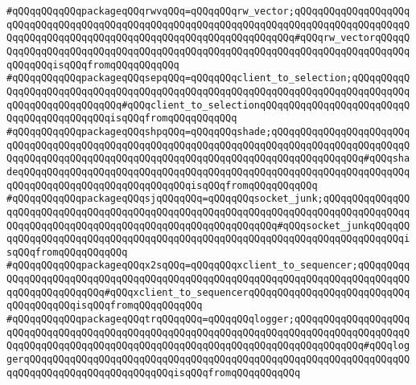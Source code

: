 \verb|#qQQqqQQqqQQqpackageqQQqrwvqQQq=qQQqqQQqrw_vector;qQQqqQQqqQQqqQQqqQQqqQQqqQQqqQQqqQQqqQQqqQQqqQQqqQQqqQQqqQQqqQQqqQQqqQQqqQQqqQQqqQQqqQQqqQQqqQQqqQQqqQQqqQQqqQQqqQQqqQQqqQQqqQQqqQQqqQQqqQQq#qQQqrw_vectorqQQqqQQqqQQqqQQqqQQqqQQqqQQqqQQqqQQqqQQqqQQqqQQqqQQqqQQqqQQqqQQqqQQqqQQqqQQqqQQqqQQqisqQQqfromqQQqqQQqqQQq|\newline
\verb|#qQQqqQQqqQQqpackageqQQqsepqQQq=qQQqqQQqclient_to_selection;qQQqqQQqqQQqqQQqqQQqqQQqqQQqqQQqqQQqqQQqqQQqqQQqqQQqqQQqqQQqqQQqqQQqqQQqqQQqqQQqqQQqqQQqqQQqqQQqqQQq#qQQqclient_to_selectionqQQqqQQqqQQqqQQqqQQqqQQqqQQqqQQqqQQqqQQqqQQqisqQQqfromqQQqqQQqqQQq|\newline
\verb|#qQQqqQQqqQQqpackageqQQqshpqQQq=qQQqqQQqshade;qQQqqQQqqQQqqQQqqQQqqQQqqQQqqQQqqQQqqQQqqQQqqQQqqQQqqQQqqQQqqQQqqQQqqQQqqQQqqQQqqQQqqQQqqQQqqQQqqQQqqQQqqQQqqQQqqQQqqQQqqQQqqQQqqQQqqQQqqQQqqQQqqQQqqQQqqQQq#qQQqshadeqQQqqQQqqQQqqQQqqQQqqQQqqQQqqQQqqQQqqQQqqQQqqQQqqQQqqQQqqQQqqQQqqQQqqQQqqQQqqQQqqQQqqQQqqQQqqQQqqQQqisqQQqfromqQQqqQQqqQQq|\newline
\verb|#qQQqqQQqqQQqpackageqQQqsjqQQqqQQq=qQQqqQQqsocket_junk;qQQqqQQqqQQqqQQqqQQqqQQqqQQqqQQqqQQqqQQqqQQqqQQqqQQqqQQqqQQqqQQqqQQqqQQqqQQqqQQqqQQqqQQqqQQqqQQqqQQqqQQqqQQqqQQqqQQqqQQqqQQqqQQqqQQq#qQQqsocket_junkqQQqqQQqqQQqqQQqqQQqqQQqqQQqqQQqqQQqqQQqqQQqqQQqqQQqqQQqqQQqqQQqqQQqqQQqqQQqisqQQqfromqQQqqQQqqQQq|\newline
\verb|#qQQqqQQqqQQqpackageqQQqx2sqQQq=qQQqqQQqxclient_to_sequencer;qQQqqQQqqQQqqQQqqQQqqQQqqQQqqQQqqQQqqQQqqQQqqQQqqQQqqQQqqQQqqQQqqQQqqQQqqQQqqQQqqQQqqQQqqQQqqQQq#qQQqxclient_to_sequencerqQQqqQQqqQQqqQQqqQQqqQQqqQQqqQQqqQQqqQQqisqQQqfromqQQqqQQqqQQq|\newline
\verb|#qQQqqQQqqQQqpackageqQQqtrqQQqqQQq=qQQqqQQqlogger;qQQqqQQqqQQqqQQqqQQqqQQqqQQqqQQqqQQqqQQqqQQqqQQqqQQqqQQqqQQqqQQqqQQqqQQqqQQqqQQqqQQqqQQqqQQqqQQqqQQqqQQqqQQqqQQqqQQqqQQqqQQqqQQqqQQqqQQqqQQqqQQqqQQqqQQq#qQQqloggerqQQqqQQqqQQqqQQqqQQqqQQqqQQqqQQqqQQqqQQqqQQqqQQqqQQqqQQqqQQqqQQqqQQqqQQqqQQqqQQqqQQqqQQqqQQqqQQqisqQQqfromqQQqqQQqqQQq|\newline

